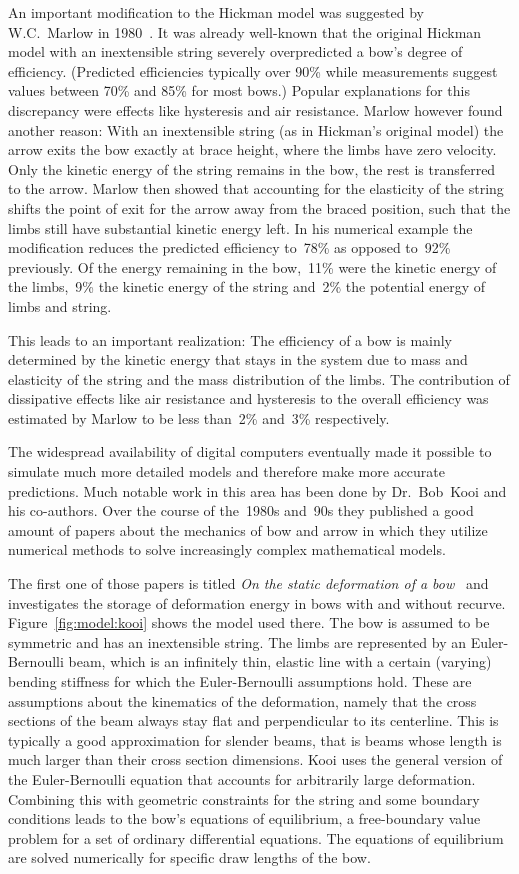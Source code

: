 An important modification to the Hickman model was suggested by W.C.~Marlow in 1980~\cite{bib:ma80}.
It was already well-known that the original Hickman model with an inextensible string severely overpredicted a bow's degree of efficiency.
(Predicted efficiencies typically over 90\% while measurements suggest values between 70\% and 85\% for most bows.)
Popular explanations for this discrepancy were effects like hysteresis and air resistance.
Marlow however found another reason: With an inextensible string (as in Hickman's original model) the arrow exits the bow exactly at brace height, where the limbs have zero velocity.
Only the kinetic energy of the string remains in the bow, the rest is transferred to the arrow.
Marlow then showed that accounting for the elasticity of the string shifts the point of exit for the arrow away from the braced position, such that the limbs still have substantial kinetic energy left. In his numerical example the modification reduces the predicted efficiency to~78\% as opposed to~92\% previously.
Of the energy remaining in the bow,~11\% were the kinetic energy of the limbs,~9\% the kinetic energy of the string and~2\% the potential energy of limbs and string.

This leads to an important realization: The efficiency of a bow is mainly determined by the kinetic energy that stays in the system due to mass and elasticity of the string and the mass distribution of the limbs. The contribution of dissipative effects like air resistance and hysteresis to the overall efficiency was estimated by Marlow to be less than~2\% and~3\% respectively.

The widespread availability of digital computers eventually made it possible to simulate much more detailed models and therefore make more accurate predictions.
Much notable work in this area has been done by Dr.~Bob~Kooi and his co-authors.
Over the course of the~1980s and~90s they published a good amount of papers about the mechanics of bow and arrow in which they utilize numerical methods to solve increasingly complex mathematical models.

The first one of those papers is titled \textit{On the static deformation of a bow}~\cite{bib:kosp80} and investigates the storage of deformation energy in bows with and without recurve. Figure~\ref{fig:model:kooi} shows the model used there.
The bow is assumed to be symmetric and has an inextensible string.
The limbs are represented by an Euler-Bernoulli beam, which is an infinitely thin, elastic line with a certain (varying) bending stiffness for which the Euler-Bernoulli assumptions hold.
These are assumptions about the kinematics of the deformation, namely that the cross sections of the beam always stay flat and perpendicular to its centerline. This is typically a good approximation for slender beams, that is beams whose length is much larger than their cross section dimensions. Kooi uses the general version of the Euler-Bernoulli equation that accounts for arbitrarily large deformation. Combining this with geometric constraints for the string and some boundary conditions leads to the bow's equations of equilibrium, a free-boundary value problem for a set of ordinary differential equations. The equations of equilibrium are solved numerically for specific draw lengths of the bow.

